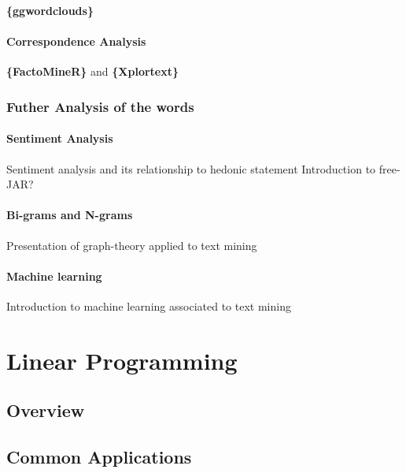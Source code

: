 \documentclass[
]{book}
\begin{document}
\textbf{\{ggwordclouds\}}

\hypertarget{correspondence-analysis}{%
\subsubsection{Correspondence Analysis}\label{correspondence-analysis}}

\textbf{\{FactoMineR\}} and \textbf{\{Xplortext\}}

\hypertarget{futher-analysis-of-the-words}{%
\subsection{Futher Analysis of the words}\label{futher-analysis-of-the-words}}

\hypertarget{sentiment-analysis-1}{%
\subsubsection{Sentiment Analysis}\label{sentiment-analysis-1}}

Sentiment analysis and its relationship to hedonic statement
Introduction to free-JAR?

\hypertarget{bi-grams-and-n-grams}{%
\subsubsection{Bi-grams and N-grams}\label{bi-grams-and-n-grams}}

Presentation of graph-theory applied to text mining

\hypertarget{machine-learning-1}{%
\subsubsection{Machine learning}\label{machine-learning-1}}

Introduction to machine learning associated to text mining

\hypertarget{linear-programming}{%
\chapter{Linear Programming}\label{linear-programming}}

\hypertarget{overview-2}{%
\section{Overview}\label{overview-2}}

\hypertarget{common-applications-2}{%
\section{Common Applications}\label{common-applications-2}}
\end{document}
